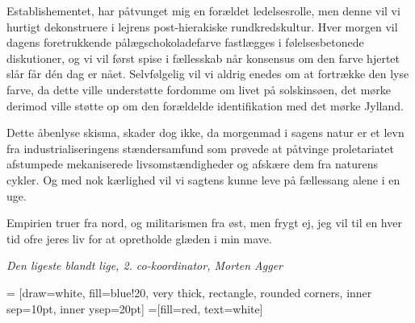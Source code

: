 \begin{minipage}[b]{0.95\linewidth}
\begin{minipage}[t]{0.47\textwidth}
Establishementet, har påtvunget mig en forældet ledelsesrolle, men denne vil vi hurtigt dekonstruere i lejrens post-hierakiske rundkredskultur. Hver morgen vil dagens foretrukkende pålægschokoladefarve fastlægges i følelsesbetonede diskutioner, og vi vil først spise i fællesskab når konsensus om den farve hjertet slår får dén dag er nået. Selvfølgelig vil vi aldrig enedes om at fortrække den lyse farve, da dette ville understøtte fordomme om livet på solskinsøen, det mørke derimod ville støtte op om den forældelde identifikation med det mørke Jylland. 

Dette åbenlyse skisma, skader dog ikke, da morgenmad i sagens natur er et levn fra industrialiseringens stændersamfund som prøvede at påtvinge proletariatet afstumpede mekaniserede livsomstændigheder og afskære dem fra naturens cykler. Og med nok kærlighed vil vi sagtens kunne leve på fællessang alene i en uge.

Empirien truer fra nord, og militarismen fra øst, men frygt ej, jeg vil til en hver tid ofre jeres liv for at opretholde glæden i min mave. 

{\flushright\emph{Den ligeste blandt lige, 2. co-koordinator, Morten Agger}}

\end{minipage}
\hfill\begin{minipage}[t]{0.47\textwidth}

\vspace{1mm}
 = [draw=white, fill=blue!20, very thick,
    rectangle, rounded corners, inner sep=10pt, inner ysep=20pt]
 =[fill=red, text=white]

%


\end{minipage}
\end{minipage}
